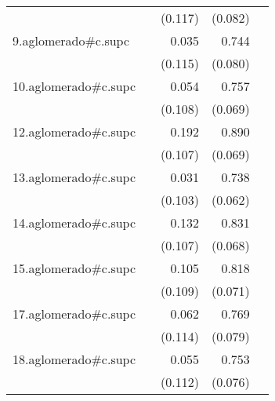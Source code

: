 {\begin{longtable}{l*{4}{D{.}{.}{-1}}}
            &                     &     (0.117)         &     (0.082)         &                     \\
\addlinespace
9.aglomerado#c.supc&                     &       0.035         &       0.744\sym{***}&                     \\
            &                     &     (0.115)         &     (0.080)         &                     \\
\addlinespace
10.aglomerado#c.supc&                     &       0.054         &       0.757\sym{***}&                     \\
            &                     &     (0.108)         &     (0.069)         &                     \\
\addlinespace
12.aglomerado#c.supc&                     &       0.192         &       0.890\sym{***}&                     \\
            &                     &     (0.107)         &     (0.069)         &                     \\
\addlinespace
13.aglomerado#c.supc&                     &       0.031         &       0.738\sym{***}&                     \\
            &                     &     (0.103)         &     (0.062)         &                     \\
\addlinespace
14.aglomerado#c.supc&                     &       0.132         &       0.831\sym{***}&                     \\
            &                     &     (0.107)         &     (0.068)         &                     \\
\addlinespace
15.aglomerado#c.supc&                     &       0.105         &       0.818\sym{***}&                     \\
            &                     &     (0.109)         &     (0.071)         &                     \\
\addlinespace
17.aglomerado#c.supc&                     &       0.062         &       0.769\sym{***}&                     \\
            &                     &     (0.114)         &     (0.079)         &                     \\
\addlinespace
18.aglomerado#c.supc&                     &       0.055         &       0.753\sym{***}&                     \\
            &                     &     (0.112)         &     (0.076)         &                     \\

\end{longtable}}
